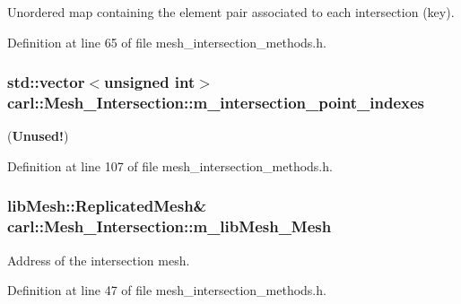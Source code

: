 Unordered map containing the element pair associated to each intersection (key). 



Definition at line 65 of file mesh\+\_\+intersection\+\_\+methods.\+h.

\hypertarget{classcarl_1_1_mesh___intersection_aac5e4b495b7d8aa532ce28ca2d495c69}{}
\subsubsection[{m\+\_\+intersection\+\_\+point\+\_\+indexes}]{\setlength{\rightskip}{0pt plus 5cm}std\+::vector$<$unsigned int$>$ carl\+::\+Mesh\+\_\+\+Intersection\+::m\+\_\+intersection\+\_\+point\+\_\+indexes\hspace{0.3cm}{\ttfamily [protected]}}\label{classcarl_1_1_mesh___intersection_aac5e4b495b7d8aa532ce28ca2d495c69}


({\bfseries Unused!}) 



Definition at line 107 of file mesh\+\_\+intersection\+\_\+methods.\+h.

\hypertarget{classcarl_1_1_mesh___intersection_aeea7835637a936ca4f272e48cea18fa2}{}
\subsubsection[{m\+\_\+lib\+Mesh\+\_\+\+Mesh}]{\setlength{\rightskip}{0pt plus 5cm}lib\+Mesh\+::\+Replicated\+Mesh\& carl\+::\+Mesh\+\_\+\+Intersection\+::m\+\_\+lib\+Mesh\+\_\+\+Mesh\hspace{0.3cm}{\ttfamily [protected]}}\label{classcarl_1_1_mesh___intersection_aeea7835637a936ca4f272e48cea18fa2}


Address of the intersection mesh. 



Definition at line 47 of file mesh\+\_\+intersection\+\_\+methods.\+h.

